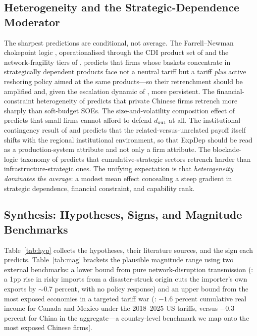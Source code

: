 \subsection{Heterogeneity and the Strategic-Dependence Moderator}
\label{subsec:exp_het}

The sharpest predictions are conditional, not average. The Farrell--Newman chokepoint
logic \citep{farrell2019}, operationalised through the CDI product set of
\citet{arjona2023} and the network-fragility tiers of \citet{korniyenko2017}, predicts
that firms whose baskets concentrate in strategically dependent products face not a
neutral tariff but a tariff \emph{plus} active reshoring policy aimed at the same
products---so their retrenchment should be amplified and, given the escalation dynamic
of \citet{evenett2024}, more persistent. The financial-constraint heterogeneity of
\citet{guariglia2011} predicts that private Chinese firms retrench more sharply than
soft-budget SOEs. The size-and-volatility composition effect of
\citet{vannoorenberghe2016} predicts that small firms cannot afford to defend
$d_{\rm out}$ at all. The institutional-contingency result of \citet{delios2008} and
\citet{boschma2015} predicts that the related-versus-unrelated payoff itself shifts
with the regional institutional environment, so that ExpDep should be read as a
production-system attribute and not only a firm attribute. The blockade-logic taxonomy
of \citet{fontana2024} predicts that cumulative-strategic sectors retrench harder than
infrastructure-strategic ones. The unifying expectation is that \emph{heterogeneity
dominates the average}: a modest mean effect concealing a steep gradient in strategic
dependence, financial constraint, and capability rank.

\subsection{Synthesis: Hypotheses, Signs, and Magnitude Benchmarks}
\label{subsec:exp_synth}

Table~\ref{tab:hyp} collects the hypotheses, their literature sources, and the sign
each predicts. Table~\ref{tab:mag} brackets the plausible magnitude range using two
external benchmarks: a lower bound from pure network-disruption transmission
(\citealp{korniyenko2017}: a 1pp rise in risky imports from a disaster-struck origin
cuts the importer's own exports by $\sim$0.7 percent, with no policy response) and an upper
bound from the most exposed economies in a targeted tariff war (\citealp{teti2025}:
$-1.6$ percent cumulative real income for Canada and Mexico under the 2018--2025 US tariffs,
versus $-0.3$ percent for China in the aggregate---a country-level benchmark we map onto the
most exposed Chinese firms).

